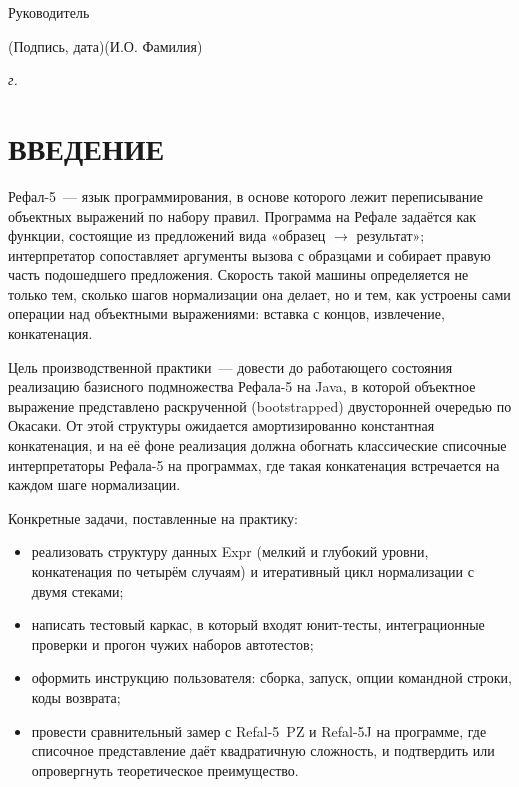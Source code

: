 \documentclass[14pt, russian]{scrartcl}
\newcommand{\prog}[1]{{\ttfamily\small#1}}
\newcommand{\anonsection}[1]{\cleardoublepage
\phantomsection
\addcontentsline{toc}{section}{\protect\numberline{}#1}
\section*{#1}\vspace*{2.5ex}}
\begin{document}
\begin{titlepage}
\bigskip

\noindent Руководитель  \hfill \underline{\hspace{4cm}}\quad
\underline{\hspace{4cm}}

\vspace{-2ex}
\noindent\hspace{13.5ex}\normalsize\hspace{170pt}\hspace{2ex}\scriptsize{(Подпись, дата)}\normalsize\hspace{30pt}\hspace{6ex}\scriptsize{(И.О. Фамилия)}\normalsize
\vfill

\begin{center}
\textsl{\the\year{} г.}
\end{center}
\end{titlepage}

\setlength{\tabcolsep}{3pt}
\newpage
\setcounter{page}{2}

\renewcommand\contentsname{\hfill{\normalfont{СОДЕРЖАНИЕ}}\hfill}
\tableofcontents
\newpage

\anonsection{ВВЕДЕНИЕ}

Рефал-5~--- язык программирования, в основе которого лежит переписывание
объектных выражений по набору правил. Программа на Рефале задаётся как
функции, состоящие из предложений вида «образец $\to$ результат»;
интерпретатор сопоставляет аргументы вызова с образцами и собирает
правую часть подошедшего предложения. Скорость такой машины определяется
не только тем, сколько шагов нормализации она делает, но и тем, как
устроены сами операции над объектными выражениями: вставка с концов,
извлечение, конкатенация.

Цель производственной практики~--- довести до работающего состояния
реализацию базисного подмножества Рефала-5 на Java, в которой объектное
выражение представлено раскрученной (bootstrapped) двусторонней очередью
по Окасаки. От этой структуры ожидается амортизированно константная
конкатенация, и на её фоне реализация должна обогнать классические
списочные интерпретаторы Рефала-5 на программах, где такая конкатенация
встречается на каждом шаге нормализации.

Конкретные задачи, поставленные на практику:
\begin{itemize}
  \item реализовать структуру данных \prog{Expr} (мелкий и глубокий
        уровни, конкатенация по четырём случаям) и итеративный цикл
        нормализации с двумя стеками;
  \item написать тестовый каркас, в который входят юнит-тесты, интеграционные
        проверки и прогон чужих наборов автотестов;
  \item оформить инструкцию пользователя: сборка, запуск, опции командной
        строки, коды возврата;
  \item провести сравнительный замер с Refal-5~PZ и Refal-5J на программе,
        где списочное представление даёт квадратичную сложность,
        и подтвердить или опровергнуть теоретическое преимущество.
\end{itemize}
\end{document}
